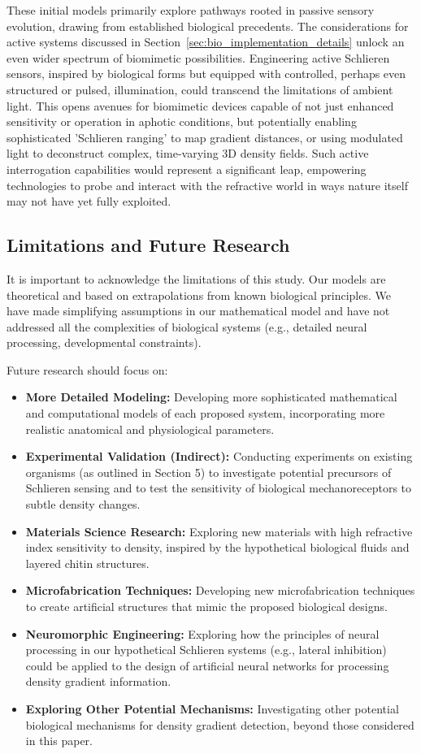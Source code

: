 \documentclass[11pt]{article}
\begin{document}
These initial models primarily explore pathways rooted in passive sensory evolution, drawing from established biological precedents. The considerations for active systems discussed in Section~\ref{sec:bio_implementation_details} unlock an even wider spectrum of biomimetic possibilities. Engineering active Schlieren sensors, inspired by biological forms but equipped with controlled, perhaps even structured or pulsed, illumination, could transcend the limitations of ambient light. This opens avenues for biomimetic devices capable of not just enhanced sensitivity or operation in aphotic conditions, but potentially enabling sophisticated 'Schlieren ranging' to map gradient distances, or using modulated light to deconstruct complex, time-varying 3D density fields. Such active interrogation capabilities would represent a significant leap, empowering technologies to probe and interact with the refractive world in ways nature itself may not have yet fully exploited.

\subsection{Limitations and Future Research}

It is important to acknowledge the limitations of this study. Our models are theoretical and based on extrapolations from known biological principles. We have made simplifying assumptions in our mathematical model and have not addressed all the complexities of biological systems (e.g., detailed neural processing, developmental constraints).

Future research should focus on:
\begin{itemize}
    \item \textbf{More Detailed Modeling:} Developing more sophisticated mathematical and computational models of each proposed system, incorporating more realistic anatomical and physiological parameters.
    \item \textbf{Experimental Validation (Indirect):} Conducting experiments on existing organisms (as outlined in Section 5) to investigate potential precursors of Schlieren sensing and to test the sensitivity of biological mechanoreceptors to subtle density changes.
    \item \textbf{Materials Science Research:} Exploring new materials with high refractive index sensitivity to density, inspired by the hypothetical biological fluids and layered chitin structures.
    \item \textbf{Microfabrication Techniques:} Developing new microfabrication techniques to create artificial structures that mimic the proposed biological designs.
    \item \textbf{Neuromorphic Engineering:} Exploring how the principles of neural processing in our hypothetical Schlieren systems (e.g., lateral inhibition) could be applied to the design of artificial neural networks for processing density gradient information.
    \item \textbf{Exploring Other Potential Mechanisms:} Investigating other potential biological mechanisms for density gradient detection, beyond those considered in this paper.
\end{itemize}
\newpage
\end{document}
